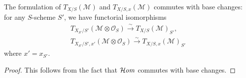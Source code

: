 \begin{proposition}\label{scheme tangent bundle commutes with base change}
The formulation of $T_{X/S}(\mathscr{M})$ and $T_{X/S,x}(\mathscr{M})$ commutes with base changes: for any $S$-scheme $S'$, we have functorial isomorphisms
\begin{align*}
T_{X_{S'}/S'}(\mathscr{M}\otimes\mathscr{O}_S)\stackrel{\sim}{\to} T_{X/S}(\mathscr{M})_{S'},\\
T_{X_{S'}/S',x'}(\mathscr{M}\otimes\mathscr{O}_S)\stackrel{\sim}{\to} T_{X/S,x}(\mathscr{M})_{S'}
\end{align*}
where $x'=x_{S'}$.
\end{proposition}
\begin{proof}
This follows from the fact that $\operatorname{\mathcal{H}\hspace*{-0.4pt}\textit{om}\hspace{0.5pt}}$ commutes with base changes.
\end{proof}

